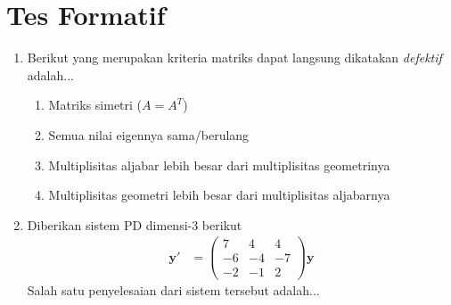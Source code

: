 \documentclass[a4paper]{article}
\theoremstyle{definisi}
\numberwithin{equation}{section}
\begin{document}
  \section*{Tes Formatif}
  \begin{enumerate}
    \item Berikut yang merupakan kriteria matriks dapat langsung dikatakan \textit{defektif} adalah...
    \begin{enumerate}
      \item Matriks simetri ($A=A^T$)
      \item Semua nilai eigennya sama/berulang
      \item Multiplisitas aljabar lebih besar dari multiplisitas geometrinya
      \item Multiplisitas geometri lebih besar dari multiplisitas aljabarnya
    \end{enumerate}
    \item Diberikan sistem PD dimensi-3 berikut
    \begin{align*}
      \mathbf{y'}&=\begin{pmatrix}
        7&4&4\\
        -6&-4&-7\\
        -2&-1&2
      \end{pmatrix}\mathbf{y}
    \end{align*}
    Salah satu penyelesaian dari sistem tersebut adalah...
\end{enumerate}
\end{document}
